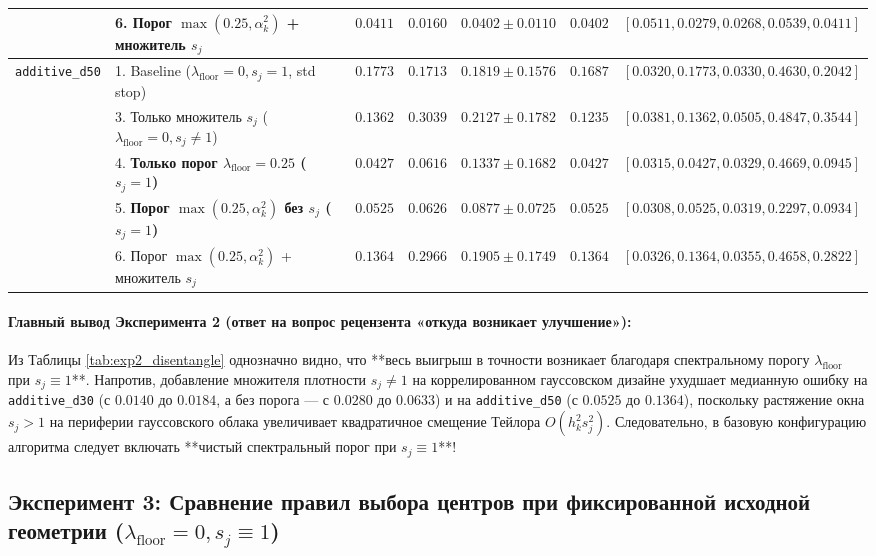 \documentclass[11pt,a4paper]{article}
\theoremstyle{definition}
\theoremstyle{remark}
\begin{document}
\begin{table}[ht!]
{\begin{tabular}{@{}llrrrrl@{}}
 & 6. Порог $\max(0.25, \alpha_k^2)$ + множитель $s_j$ & $0.0411$ & $0.0160$ & $\mathbf{0.0402 \pm 0.0110}$ & $0.0402$ & $[0.0511, 0.0279, 0.0268, 0.0539, 0.0411]$ \\
\midrule
\texttt{additive\_d50} & 1. Baseline ($\lambda_{\mathrm{floor}}=0, s_j=1$, std stop) & $0.1773$ & $0.1713$ & $0.1819 \pm 0.1576$ & $0.1687$ & $[0.0320, 0.1773, 0.0330, 0.4630, 0.2042]$ \\
 & 3. Только множитель $s_j$ ($\lambda_{\mathrm{floor}}=0, s_j \neq 1$) & $0.1362$ & $0.3039$ & $0.2127 \pm 0.1782$ & $0.1235$ & $[0.0381, 0.1362, 0.0505, 0.4847, 0.3544]$ \\
 & 4. \textbf{Только порог $\lambda_{\mathrm{floor}}=0.25$ ($s_j=1$)} & $\mathbf{0.0427}$ & $0.0616$ & $0.1337 \pm 0.1682$ & $\mathbf{0.0427}$ & $[0.0315, 0.0427, 0.0329, 0.4669, 0.0945]$ \\
 & 5. \textbf{Порог $\max(0.25, \alpha_k^2)$ без $s_j$ ($s_j=1$)} & $0.0525$ & $0.0626$ & $\mathbf{0.0877 \pm 0.0725}$ & $0.0525$ & $[0.0308, 0.0525, 0.0319, 0.2297, 0.0934]$ \\
 & 6. Порог $\max(0.25, \alpha_k^2)$ + множитель $s_j$ & $0.1364$ & $0.2966$ & $0.1905 \pm 0.1749$ & $0.1364$ & $[0.0326, 0.1364, 0.0355, 0.4658, 0.2822]$ \\
\bottomrule
\end{tabular}%
}
\end{table}

\paragraph{Главный вывод Эксперимента 2 (ответ на вопрос рецензента «откуда возникает улучшение»):}
Из Таблицы \ref{tab:exp2_disentangle} однозначно видно, что **весь выигрыш в точности возникает благодаря спектральному порогу $\lambda_{\mathrm{floor}}$ при $s_j \equiv 1$**. Напротив, добавление множителя плотности $s_j \neq 1$ на коррелированном гауссовском дизайне ухудшает медианную ошибку на \texttt{additive\_d30} (с $0.0140$ до $0.0184$, а без порога --- с $0.0280$ до $0.0633$) и на \texttt{additive\_d50} (с $0.0525$ до $0.1364$), поскольку растяжение окна $s_j > 1$ на периферии гауссовского облака увеличивает квадратичное смещение Тейлора $O(h_k^2 s_j^2)$. Следовательно, в базовую конфигурацию алгоритма следует включать **чистый спектральный порог при $s_j \equiv 1$**!

\subsection{Эксперимент 3: Сравнение правил выбора центров при фиксированной исходной геометрии ($\lambda_{\mathrm{floor}}=0, s_j \equiv 1$)}
\end{document}
